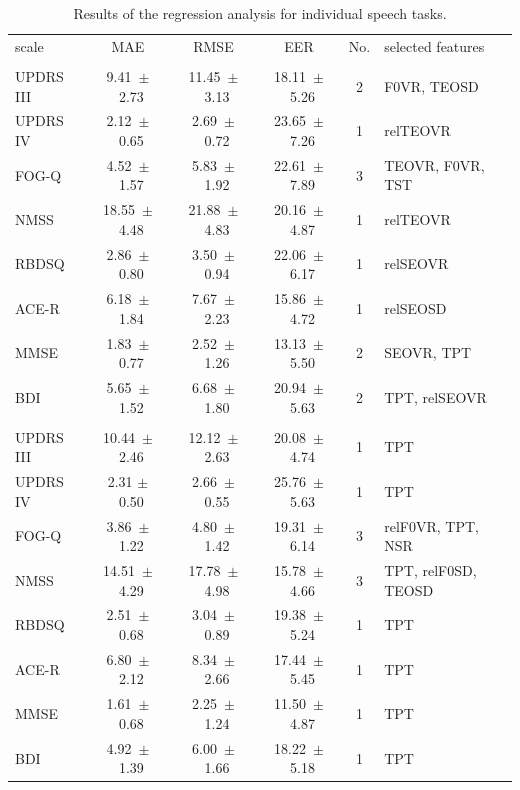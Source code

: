 \begin{table}[htb!]
	\centering
	\begin{threeparttable}
		\caption{Results of the regression analysis for individual speech tasks.}
		\label{tab:ch5_classification_groups}
		\footnotesize
		\centering
		\begin{tabular}{l c c c c l}
		
			\hline\hline\noalign{\smallskip}
			\rowcolor{gray_table}
			scale & MAE & RMSE & EER & No. & selected features \\
			\noalign{\smallskip}
			\multicolumn{6}{c}{Poem recitation task} \\
			\noalign{\smallskip}\hline\noalign{\smallskip}
			
			UPDRS III &  9.41~$\pm$~2.73 & 11.45~$\pm$~3.13 & 18.11~$\pm$~5.26 & 2 & F0VR, TEOSD \\
			UPDRS IV  &  2.12~$\pm$~0.65 &  2.69~$\pm$~0.72 & 23.65~$\pm$~7.26 & 1 & relTEOVR \\
			FOG-Q     &  4.52~$\pm$~1.57 &  5.83~$\pm$~1.92 & 22.61~$\pm$~7.89 & 3 & TEOVR, F0VR, TST \\
			NMSS      & 18.55~$\pm$~4.48 & 21.88~$\pm$~4.83 & 20.16~$\pm$~4.87 & 1 & relTEOVR \\
			RBDSQ     &  2.86~$\pm$~0.80 &  3.50~$\pm$~0.94 & 22.06~$\pm$~6.17 & 1 & relSEOVR \\
			ACE-R     &  6.18~$\pm$~1.84 &  7.67~$\pm$~2.23 & 15.86~$\pm$~4.72 & 1 & relSEOSD \\
			MMSE      &  1.83~$\pm$~0.77 &  2.52~$\pm$~1.26 & 13.13~$\pm$~5.50 & 2 & SEOVR, TPT \\
			BDI       &  5.65~$\pm$~1.52 &  6.68~$\pm$~1.80 & 20.94~$\pm$~5.63 & 2 & TPT, relSEOVR \\
			
			\noalign{\smallskip}\hline\noalign{\smallskip}
			\multicolumn{6}{c}{Reading with neutral emotion} \\
			\noalign{\smallskip}\hline\noalign{\smallskip}
			
			UPDRS III & 10.44~$\pm$~2.46 & 12.12~$\pm$~2.63 & 20.08~$\pm$~4.74 & 1 & TPT \\
			UPDRS IV  &  2.31 $\pm$~0.50 &  2.66~$\pm$~0.55 & 25.76~$\pm$~5.63 & 1 & TPT \\
			FOG-Q     &  3.86~$\pm$~1.22 &  4.80~$\pm$~1.42 & 19.31~$\pm$~6.14 & 3 & relF0VR, TPT, NSR \\
			NMSS      & 14.51~$\pm$~4.29 & 17.78~$\pm$~4.98 & 15.78~$\pm$~4.66 & 3 & TPT, relF0SD, TEOSD \\
			RBDSQ     &  2.51~$\pm$~0.68 &  3.04~$\pm$~0.89 & 19.38~$\pm$~5.24 & 1 & TPT \\
			ACE-R     &  6.80~$\pm$~2.12 &  8.34~$\pm$~2.66 & 17.44~$\pm$~5.45 & 1 & TPT \\
			MMSE      &  1.61~$\pm$~0.68 &  2.25~$\pm$~1.24 & 11.50~$\pm$~4.87 & 1 & TPT \\
			BDI       &  4.92~$\pm$~1.39 &  6.00~$\pm$~1.66 & 18.22~$\pm$~5.18 & 1 & TPT \\
			

\end{tabular}
\end{threeparttable}
\end{table}
